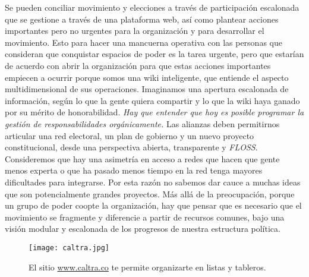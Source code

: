 Se pueden conciliar movimiento y elecciones a través de participación escalonada que se gestione a través de una plataforma web, así como plantear acciones importantes pero no urgentes para la organización y para desarrollar el movimiento. Esto para hacer una mancuerna operativa con las personas que consideran que conquistar espacios de poder es la tarea urgente, pero que estarían de acuerdo con abrir la organización para que estas acciones importantes empiecen a ocurrir porque somos una wiki inteligente, que entiende el aspecto multidimensional de sus operaciones. Imaginamos una apertura escalonada de información, según lo que la gente quiera compartir y lo que la wiki haya ganado por su mérito de honorabilidad. \emph{Hay que entender que hoy es posible programar la gestión de responsabilidades orgánicamente.} Las alianzas deben permitirnos articular una red electoral, un plan de gobierno y un nuevo proyecto constitucional, desde una perspectiva abierta, transparente y \emph{FLOSS}. Consideremos que hay una asimetría en acceso a redes que hacen que gente menos experta o que ha pasado menos tiempo en la red tenga mayores dificultades para integrarse. Por esta razón no sabemos dar cauce a muchas ideas que son potencialmente grandes proyectos. Más allá de la preocupación, porque un grupo de poder coopte la organización, hay que pensar que es necesario que el movimiento se fragmente y diferencie a partir de recursos comunes, bajo una visión modular y escalonada de los progresos de nuestra estructura política.

\begin{figure}[htbp]
	\centering
	\texttt{[image: caltra.jpg]}
	\caption{El sitio \url{www.caltra.co} te permite organizarte en listas y tableros.}
\end{figure}

